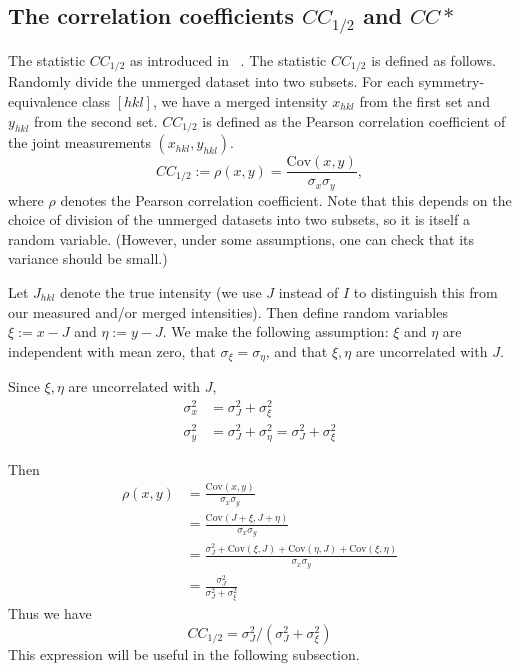 \documentclass[11pt,a4paper]{article}
\def\CChalf{CC_{1/2}}
\def\CCstar{CC\ast}
\def\cov{\mathrm{Cov}}
\begin{document}
\subsection{The correlation coefficients $\CChalf$ and $\CCstar$}
The statistic $\CChalf$ as introduced in ~\cite{KaDi12}.
The statistic $\CChalf$ is defined as follows. Randomly divide the unmerged dataset into two subsets. For each symmetry-equivalence class $[hkl]$,
we have a merged intensity $x_{hkl}$ from the first set and $y_{hkl}$ from the second set. $\CChalf$ is defined as the Pearson correlation coefficient
of the joint measurements $(x_{hkl}, y_{hkl})$.
\begin{equation}
  \CChalf := \rho(x, y) = \frac{\cov(x, y)}{\sigma_x \sigma_y},
\end{equation}
where $\rho$ denotes the Pearson correlation coefficient. Note that this depends on the choice of division of the unmerged datasets into two subsets,
so it is itself a random variable. (However, under some assumptions, one can check that its variance should be small.)

Let $J_{hkl}$ denote the true intensity (we use $J$ instead of $I$ to distinguish this from our measured and/or merged intensities).
Then define random variables $\xi := x - J$ and $\eta := y - J$. We make the following assumption: $\xi$ and $\eta$ are independent
with mean zero, that $\sigma_\xi = \sigma_\eta$, and that $\xi,\eta$ are uncorrelated with $J$.

Since $\xi,\eta$ are uncorrelated with $J$,
\begin{align}
  \sigma^2_x &= \sigma^2_J + \sigma^2_\xi \\
  \sigma^2_y &= \sigma^2_J + \sigma^2_\eta = \sigma^2_J + \sigma^2_\xi
\end{align}

Then
\begin{align}
  \rho(x,y)
  &= \frac{\cov(x, y)}{\sigma_x \sigma_y} \\
  &= \frac{\cov(J + \xi, J + \eta)}{\sigma_x \sigma_y} \\
  &= \frac{\sigma^2_J + \cov(\xi, J) + \cov(\eta, J) + \cov(\xi, \eta)}{\sigma_x \sigma_y} \\
  &= \frac{\sigma^2_J}{\sigma^2_J + \sigma^2_\xi}
\end{align}
Thus we have
\begin{equation}
  \label{cc-half-simplified}
  \CChalf = \sigma^2_J / \left(\sigma^2_J + \sigma^2_\xi \right)
\end{equation}
This expression will be useful in the following subsection.
\end{document}
